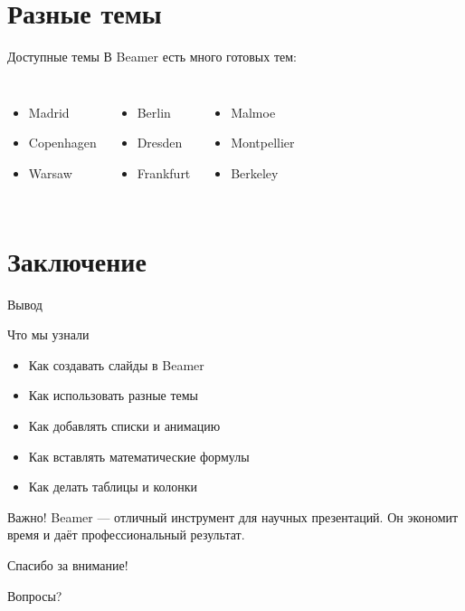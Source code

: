 \documentclass[14pt]{beamer}
\begin{document}
\section{Разные темы}

\begin{frame}{Доступные темы}
  В Beamer есть много готовых тем:
  \begin{columns}[t]
      \begin{itemize}
        \item Madrid
        \item Copenhagen
        \item Warsaw
      \end{itemize}
      \begin{itemize}
        \item Berlin
        \item Dresden
        \item Frankfurt
      \end{itemize}
      \begin{itemize}
        \item Malmoe
        \item Montpellier
        \item Berkeley
      \end{itemize}
  \end{columns}
\end{frame}

\section{Заключение}

\begin{frame}{Вывод}
  \begin{block}{Что мы узнали}
    \begin{itemize}
      \item Как создавать слайды в Beamer
      \item Как использовать разные темы
      \item Как добавлять списки и анимацию
      \item Как вставлять математические формулы
      \item Как делать таблицы и колонки
    \end{itemize}
  \end{block}
  
  \begin{alertblock}{Важно!}
    Beamer — отличный инструмент для научных презентаций.
    Он экономит время и даёт профессиональный результат.
  \end{alertblock}
\end{frame}

\begin{frame}
  \centering
  \Huge Спасибо за внимание!
  
  \vspace{1cm}
  \large Вопросы?
\end{frame}
\end{document}

